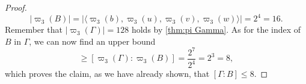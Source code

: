 \begin{proof}
\begin{equation*}
\lvert\varpi_3(B)\rvert=\lvert\langle\varpi_3(b),\varpi_3(u),\varpi_3(v),\varpi_3(w)\rangle\rvert=2^4=16.
\end{equation*}
Remember that $\lvert \varpi_3(\Gamma)\rvert=128$ holds by \cref{thm:pi Gamma}. As for the index of $B$ in $\Gamma$, we can now find an upper bound
\begin{equation*}
[\Gamma:B]\geq [\varpi_3(\Gamma):\varpi_3(B)]=\frac{2^7}{2^4}=2^3=8,
\end{equation*}
which proves the claim, as we have already shown, that $[\Gamma:B]\leq 8$.
\end{proof}


\begin{figure}
\begin{center}
\end{center}
\end{figure}
